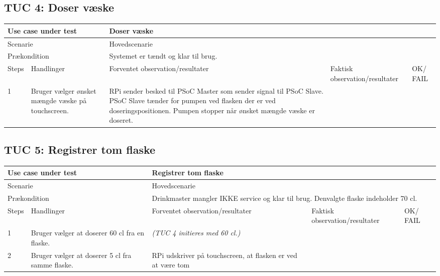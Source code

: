 \subsection{TUC 4: Doser væske}

\begin{table}[H]
\begin{tabular}{|p{1cm}|p{4cm}|p{4cm}|p{4cm}|p{1cm}|}
\hline
\multicolumn{2}{|p{5cm}|}{Use case under test} & \multicolumn{3}{p{9cm}|}{Doser væske}                                       \\ \hline
\multicolumn{2}{|p{5cm}|}{Scenarie}            & \multicolumn{3}{p{9cm}|}{Hovedscenarie}                                          \\ \hline
\multicolumn{2}{|p{5cm}|}{Prækondition}        & \multicolumn{3}{p{9cm}|}{Systemet er tændt og klar til brug.}                                 \\ \hline
Steps               & Handlinger          & Forventet observation/resultater & Faktisk observation/resultater & OK/ FAIL \\ \hline
1    & Bruger vælger ønsket mængde væske på touchscreen.  &  RPi sender besked til PSoC Master som sender signal til PSoC Slave. PSoC Slave tænder for pumpen ved flasken der er ved doseringspositionen. Pumpen stopper når ønsket mængde væske er doseret. &   &         \\ \hline

\end{tabular}
\end{table}

\subsection{TUC 5: Registrer tom flaske}

\begin{table}[H]
\begin{tabular}{|p{1cm}|p{4cm}|p{4cm}|p{4cm}|p{1cm}|}
\hline
\multicolumn{2}{|p{5cm}|}{Use case under test} & \multicolumn{3}{p{9cm}|}{Registrer tom flaske}                                       \\ \hline
\multicolumn{2}{|p{5cm}|}{Scenarie}            & \multicolumn{3}{p{9cm}|}{Hovedscenarie}                                          \\ \hline
\multicolumn{2}{|p{5cm}|}{Prækondition}        & \multicolumn{3}{p{9cm}|}{Drinkmaster mangler IKKE service og klar til brug. Denvalgte flaske indeholder 70 cl.}                                 \\ \hline
Steps               & Handlinger          & Forventet observation/resultater & Faktisk observation/resultater & OK/ FAIL \\ \hline
1    & Bruger vælger at doserer 60 cl fra en flaske.  &  \textit{(TUC 4 initieres med 60 cl.)} &   &         \\ \hline
2   & Bruger vælger at doserer 5 cl fra samme flaske. & RPi udskriver på touchscreen, at flasken er ved at være tom &    &   \\ \hline

\end{tabular}
\end{table}

